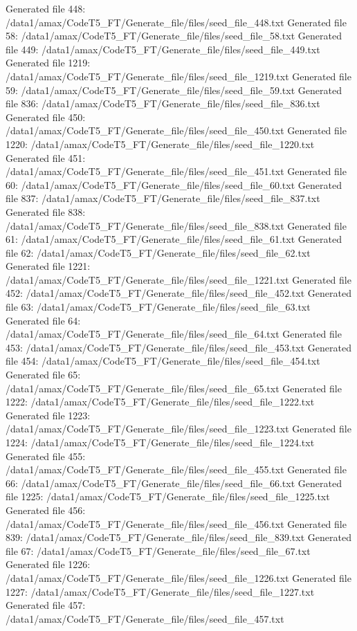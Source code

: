 Generated file 448: /data1/amax/CodeT5_FT/Generate_file/files/seed_file_448.txt
Generated file 58: /data1/amax/CodeT5_FT/Generate_file/files/seed_file_58.txt
Generated file 449: /data1/amax/CodeT5_FT/Generate_file/files/seed_file_449.txt
Generated file 1219: /data1/amax/CodeT5_FT/Generate_file/files/seed_file_1219.txt
Generated file 59: /data1/amax/CodeT5_FT/Generate_file/files/seed_file_59.txt
Generated file 836: /data1/amax/CodeT5_FT/Generate_file/files/seed_file_836.txt
Generated file 450: /data1/amax/CodeT5_FT/Generate_file/files/seed_file_450.txt
Generated file 1220: /data1/amax/CodeT5_FT/Generate_file/files/seed_file_1220.txt
Generated file 451: /data1/amax/CodeT5_FT/Generate_file/files/seed_file_451.txt
Generated file 60: /data1/amax/CodeT5_FT/Generate_file/files/seed_file_60.txt
Generated file 837: /data1/amax/CodeT5_FT/Generate_file/files/seed_file_837.txt
Generated file 838: /data1/amax/CodeT5_FT/Generate_file/files/seed_file_838.txt
Generated file 61: /data1/amax/CodeT5_FT/Generate_file/files/seed_file_61.txt
Generated file 62: /data1/amax/CodeT5_FT/Generate_file/files/seed_file_62.txt
Generated file 1221: /data1/amax/CodeT5_FT/Generate_file/files/seed_file_1221.txt
Generated file 452: /data1/amax/CodeT5_FT/Generate_file/files/seed_file_452.txt
Generated file 63: /data1/amax/CodeT5_FT/Generate_file/files/seed_file_63.txt
Generated file 64: /data1/amax/CodeT5_FT/Generate_file/files/seed_file_64.txt
Generated file 453: /data1/amax/CodeT5_FT/Generate_file/files/seed_file_453.txt
Generated file 454: /data1/amax/CodeT5_FT/Generate_file/files/seed_file_454.txt
Generated file 65: /data1/amax/CodeT5_FT/Generate_file/files/seed_file_65.txt
Generated file 1222: /data1/amax/CodeT5_FT/Generate_file/files/seed_file_1222.txt
Generated file 1223: /data1/amax/CodeT5_FT/Generate_file/files/seed_file_1223.txt
Generated file 1224: /data1/amax/CodeT5_FT/Generate_file/files/seed_file_1224.txt
Generated file 455: /data1/amax/CodeT5_FT/Generate_file/files/seed_file_455.txt
Generated file 66: /data1/amax/CodeT5_FT/Generate_file/files/seed_file_66.txt
Generated file 1225: /data1/amax/CodeT5_FT/Generate_file/files/seed_file_1225.txt
Generated file 456: /data1/amax/CodeT5_FT/Generate_file/files/seed_file_456.txt
Generated file 839: /data1/amax/CodeT5_FT/Generate_file/files/seed_file_839.txt
Generated file 67: /data1/amax/CodeT5_FT/Generate_file/files/seed_file_67.txt
Generated file 1226: /data1/amax/CodeT5_FT/Generate_file/files/seed_file_1226.txt
Generated file 1227: /data1/amax/CodeT5_FT/Generate_file/files/seed_file_1227.txt
Generated file 457: /data1/amax/CodeT5_FT/Generate_file/files/seed_file_457.txt
